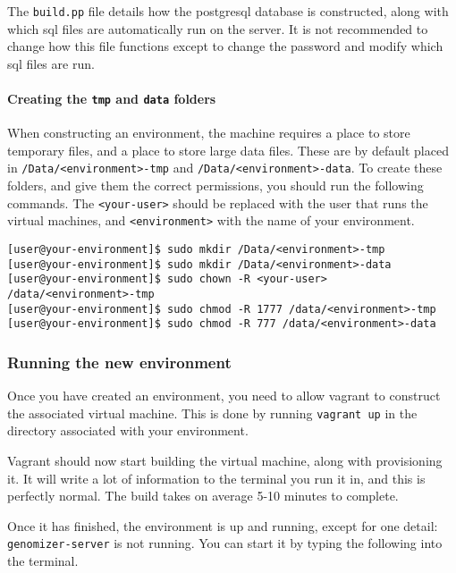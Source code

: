 The \texttt{build.pp} file details how the postgresql database is
constructed, along with which sql files are automatically run on the
server. It is not recommended to change how this file functions except
to change the password and modify which sql files are run.

\paragraph{\texorpdfstring{Creating the \texttt{tmp} and \texttt{data}
folders}{Creating the tmp and data folders}}\label{creating-the-tmp-and-data-folders}

When constructing an environment, the machine requires a place to store
temporary files, and a place to store large data files. These are by
default placed in
\texttt{/Data/\textless{}environment\textgreater{}-tmp} and
\texttt{/Data/\textless{}environment\textgreater{}-data}. To create
these folders, and give them the correct permissions, you should run the
following commands. The \texttt{\textless{}your-user\textgreater{}}
should be replaced with the user that runs the virtual machines, and
\texttt{\textless{}environment\textgreater{}} with the name of your
environment.

\begin{verbatim}
[user@your-environment]$ sudo mkdir /Data/<environment>-tmp
[user@your-environment]$ sudo mkdir /Data/<environment>-data
[user@your-environment]$ sudo chown -R <your-user> /data/<environment>-tmp
[user@your-environment]$ sudo chmod -R 1777 /data/<environment>-tmp
[user@your-environment]$ sudo chmod -R 777 /data/<environment>-data
\end{verbatim}

\subsubsection{Running the new
environment}\label{running-the-new-environment}

Once you have created an environment, you need to allow vagrant to
construct the associated virtual machine. This is done by running
\texttt{vagrant\ up} in the directory associated with your environment.

Vagrant should now start building the virtual machine, along with
provisioning it. It will write a lot of information to the terminal you
run it in, and this is perfectly normal. The build takes on average 5-10
minutes to complete.

Once it has finished, the environment is up and running, except for one
detail: \texttt{genomizer-server} is not running. You can start it by
typing the following into the terminal.

